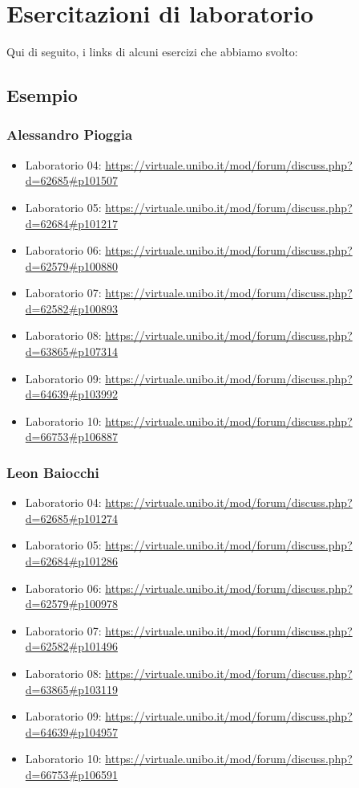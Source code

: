 \chapter{Esercitazioni di laboratorio}

\textsf{\small Qui di seguito, i links di alcuni esercizi che abbiamo svolto:} \\

\section*{Esempio}

\subsection{Alessandro Pioggia}

\begin{itemize}
	\item Laboratorio 04: \url{https://virtuale.unibo.it/mod/forum/discuss.php?d=62685#p101507}
	\item Laboratorio 05: \url{https://virtuale.unibo.it/mod/forum/discuss.php?d=62684#p101217}
	\item Laboratorio 06: \url{https://virtuale.unibo.it/mod/forum/discuss.php?d=62579#p100880}
	\item Laboratorio 07: \url{https://virtuale.unibo.it/mod/forum/discuss.php?d=62582#p100893}
	\item Laboratorio 08: \url{https://virtuale.unibo.it/mod/forum/discuss.php?d=63865#p107314}
	\item Laboratorio 09: \url{https://virtuale.unibo.it/mod/forum/discuss.php?d=64639#p103992}
	\item Laboratorio 10: \url{https://virtuale.unibo.it/mod/forum/discuss.php?d=66753#p106887}
\end{itemize}

\subsection{Leon Baiocchi}

\begin{itemize}
	\item Laboratorio 04: \url{https://virtuale.unibo.it/mod/forum/discuss.php?d=62685#p101274}
	\item Laboratorio 05: \url{https://virtuale.unibo.it/mod/forum/discuss.php?d=62684#p101286}
	\item Laboratorio 06: \url{https://virtuale.unibo.it/mod/forum/discuss.php?d=62579#p100978}
	\item Laboratorio 07: \url{https://virtuale.unibo.it/mod/forum/discuss.php?d=62582#p101496}
	\item Laboratorio 08: \url{https://virtuale.unibo.it/mod/forum/discuss.php?d=63865#p103119}
	\item Laboratorio 09: \url{https://virtuale.unibo.it/mod/forum/discuss.php?d=64639#p104957}
	\item Laboratorio 10: \url{https://virtuale.unibo.it/mod/forum/discuss.php?d=66753#p106591}
\end{itemize}



